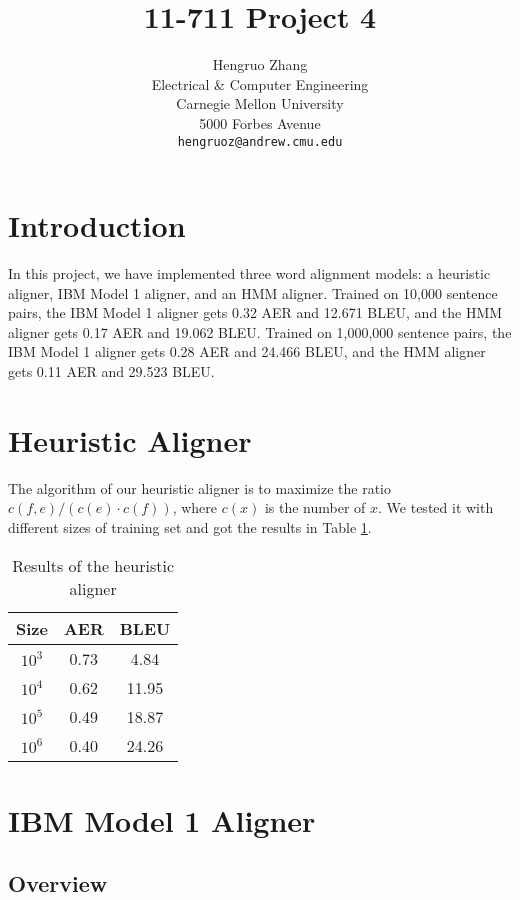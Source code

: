 \documentclass[11pt,a4paper]{article}
\title{11-711 Project 4}
\author{Hengruo Zhang \\
  Electrical \& Computer Engineering \\
  Carnegie Mellon University \\
  5000 Forbes Avenue \\
  {\tt hengruoz@andrew.cmu.edu} \\}
\date{}
\begin{document}
\maketitle
  

\section{Introduction}
In this project, we have implemented three word alignment models: a heuristic aligner, IBM Model 1 aligner, and an HMM aligner. Trained on 10,000 sentence pairs, the IBM Model 1 aligner gets 0.32 AER and 12.671 BLEU, and the HMM aligner gets 0.17 AER and 19.062 BLEU. Trained on 1,000,000 sentence pairs, the IBM Model 1 aligner gets 0.28 AER and 24.466 BLEU, and the HMM aligner gets 0.11 AER and 29.523 BLEU. 

\section{Heuristic Aligner}
The algorithm of our heuristic aligner is to maximize the ratio $c(f,e)/(c(e)\cdot c(f))$, where $c(x)$ is the number of $x$. We tested it with different sizes of training set and got the results in Table \ref{tab:heu}.

\begin{table}[h!]
  \begin{center}
  \begin{tabular}{|c|c|c|}
  \hline 
  \bf Size & \bf AER & \bf BLEU \\ 
  \hline
  $10^3$ & 0.73 & 4.84 \\
  \hline
  $10^4$ & 0.62 & 11.95 \\
  \hline
  $10^5$ & 0.49 & 18.87 \\
  \hline
  $10^6$ & 0.40 & 24.26 \\
  \hline
  \end{tabular}
  \end{center}
  \caption{Results of the heuristic aligner}
  \label{tab:heu}
\end{table}

\section{IBM Model 1 Aligner}

\subsection{Overview}
\end{document}
